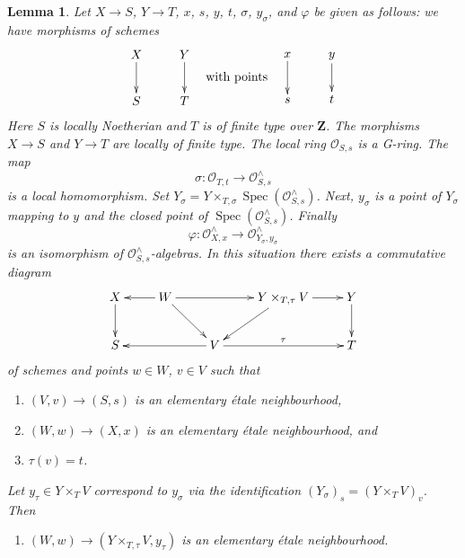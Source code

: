 \documentclass[10pt,a4paper]{amsart}
\theoremstyle{plain}
\newtheorem{lemma}[subsection]{Lemma}
\theoremstyle{definition}
\theoremstyle{remark}
\numberwithin{equation}{subsection}
\def\Spec{\mathop{\mathrm{Spec}}}
\begin{document}
\begin{lemma}
\label{lemma-relative-map-approximation-pre}
Let $X \to S$, $Y \to T$, $x$, $s$, $y$, $t$, $\sigma$, $y_\sigma$, and
$\varphi$ be given as follows: we have morphisms of schemes
$$
\vcenter{
\xymatrix{
X \ar[d] & Y \ar[d] \\
S & T
}
}
\quad\text{with points}\quad
\vcenter{
\xymatrix{
x \ar[d] & y \ar[d] \\
s & t
}
}
$$
Here $S$ is locally Noetherian and $T$ is of finite type over $\mathbf{Z}$.
The morphisms $X \to S$ and $Y \to T$ are locally of finite type.
The local ring $\mathcal{O}_{S, s}$ is a G-ring. The map
$$
\sigma : \mathcal{O}_{T, t} \longrightarrow \mathcal{O}_{S, s}^\wedge
$$
is a local homomorphism. Set
$Y_\sigma = Y \times_{T, \sigma} \Spec(\mathcal{O}_{S, s}^\wedge)$.
Next, $y_\sigma$ is a point of $Y_\sigma$ mapping to $y$ and
the closed point of $\Spec(\mathcal{O}_{S, s}^\wedge)$. Finally
$$
\varphi :
\mathcal{O}_{X, x}^\wedge
\longrightarrow
\mathcal{O}_{Y_\sigma, y_\sigma}^\wedge
$$
is an isomorphism of $\mathcal{O}_{S, s}^\wedge$-algebras.
In this situation there exists a commutative diagram
$$
\xymatrix{
X \ar[d] &
W \ar[l] \ar[rd] \ar[rr] & &
Y \times_{T, \tau} V \ar[r] \ar[ld] & Y \ar[d] \\
S & &
V \ar[ll] \ar[rr]^\tau & &
T
}
$$
of schemes and points $w \in W$, $v \in V$ such that
\begin{enumerate}
\item $(V, v) \to (S, s)$ is an elementary \'etale neighbourhood,
\item $(W, w) \to (X, x)$ is an elementary \'etale neighbourhood, and
\item $\tau(v) = t$.
\end{enumerate}
Let $y_\tau \in Y \times_T V$ correspond to $y_\sigma$
via the identification $(Y_\sigma)_s = (Y \times_T V)_v$.
Then
\begin{enumerate}
\item[(4)] $(W, w) \to (Y \times_{T, \tau} V, y_\tau)$ is an elementary
\'etale neighbourhood.
\end{enumerate}
\end{lemma}
\end{document}
